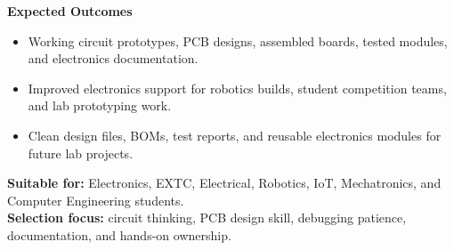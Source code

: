 \documentclass[10pt,a4paper]{article}
\newcommand{\RoleSection}[1]{\vspace{5pt}\par\noindent\textbf{#1}\par\vspace{2pt}}
\begin{document}
{\RoleSection{Expected Outcomes}
\begin{itemize}
  \item Working circuit prototypes, PCB designs, assembled boards, tested modules, and electronics documentation.
  \item Improved electronics support for robotics builds, student competition teams, and lab prototyping work.
  \item Clean design files, BOMs, test reports, and reusable electronics modules for future lab projects.
\end{itemize}

\textbf{Suitable for:} Electronics, EXTC, Electrical, Robotics, IoT, Mechatronics, and Computer Engineering students.\\
\textbf{Selection focus:} circuit thinking, PCB design skill, debugging patience, documentation, and hands-on ownership.
}
\end{document}
